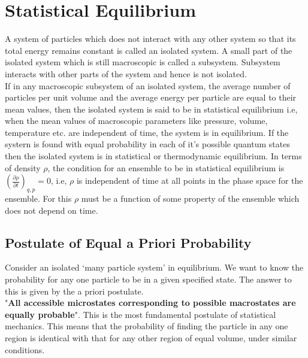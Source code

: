 \section{Statistical Equilibrium}
A system of particles which does not interact with any other system so that its total energy remains constant is called an isolated system. A small part of the isolated system which is still macroscopic is called a subsystem. Subsystem interacts with other parts of the system and hence is not isolated.\\
If in any macroscopic subsystem of an isolated system, the average number of particles per unit volume and the average energy per particle are equal to their mean values, then the isolated system is said to be in statistical equilibrium i.e, when the mean values of macroscopic parameters like pressure, volume, temperature etc. are independent of time, the system is in equilibrium. If the systern is found with equal probability in each of it's possible quantum states then the isolated system is in statistical or thermodynamic equilibrium. In terms of density $\rho$, the condition for an ensemble to be in statistical equilibrium is $\left(\frac{\partial \rho}{\partial t}\right)_{q, p}=0$, i.e, $\rho$ is independent of time at all points in the phase space for the ensemble. For this $\rho$ must be a function of some property of the ensemble which does not depend on time.
\subsection{Postulate of Equal a Priori Probability}
Consider an isolated `many particle system' in equilibrium. We want to know the probability for any one particle to be in a given specified state. The answer to this is given by the a priori postulate.\\
"\textbf{All accessible microstates corresponding to possible macrostates are equally probable}". This is the most fundamental postulate of statistical mechanics. This means that the probability of finding the particle in any one region is identical with that for any other region of equal volume, under similar conditions.

